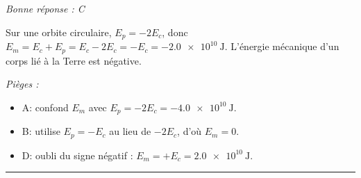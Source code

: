 \documentclass[11pt,a4paper]{article}
\begin{document}
\textit{Bonne réponse : C}\par
Sur une orbite circulaire, $E_p=-2E_c$, donc $E_m=E_c+E_p=E_c-2E_c=-E_c=\qty{-2.0e10}{\joule}$. L'énergie mécanique d'un corps lié à la Terre est négative.\par
\textit{Pièges :}
\begin{itemize}
\item A: confond $E_m$ avec $E_p=-2E_c=\qty{-4.0e10}{\joule}$.
\item B: utilise $E_p=-E_c$ au lieu de $-2E_c$, d'où $E_m=0$.
\item D: oubli du signe négatif : $E_m=+E_c=\qty{+2.0e10}{\joule}$.
\end{itemize}
\vspace{8pt}\hrule\vspace{8pt}
\end{document}
